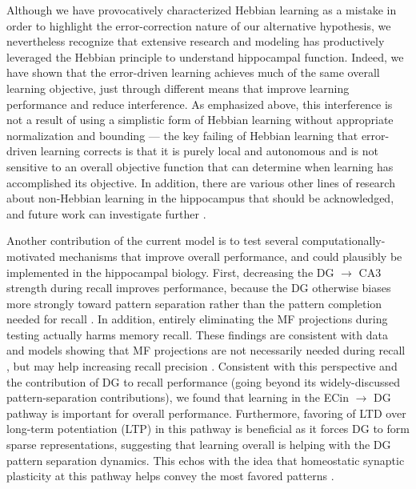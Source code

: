 \documentclass[11pt,twoside]{article}
\newif\myifpdf
\begin{document}
Although we have provocatively characterized Hebbian learning as a mistake in order to highlight the error-correction nature of our alternative hypothesis, we nevertheless recognize that extensive research and modeling has productively leveraged the Hebbian principle to understand hippocampal function.  Indeed, we have shown that the error-driven learning achieves much of the same overall learning objective, just through different means that improve learning performance and reduce interference.  As emphasized above, this interference is not a result of using a simplistic form of Hebbian learning without appropriate normalization and bounding --- the key failing of Hebbian learning that error-driven learning corrects is that it is purely local and autonomous and is not sensitive to an overall objective function that can determine when learning has accomplished its objective.  In addition, there are various other lines of research about non-Hebbian learning in the hippocampus that should be acknowledged, and future work can investigate further \citep{RebolaCartaMulle17,Jackson20,PandaRoy17,ChistiakovaBannonBazhenovEtAl14,TsukamotoYasuiYamadaEtAl03}.

Another contribution of the current model is to test several computationally-motivated mechanisms that improve overall performance, and could plausibly be implemented in the hippocampal biology. First, decreasing the DG $\rightarrow$ CA3 strength during recall improves performance, because the DG otherwise biases more strongly toward pattern separation rather than the pattern completion needed for recall \citep{OReillyMcClelland94,KunecHasselmoKopell05}. In addition, entirely eliminating the MF projections during testing actually harms memory recall.  These findings are consistent with data and models showing that MF projections are not necessarily needed during recall \citep{NakashibaCushmanPelkeyEtAl12,BernierLacagninaAyoubEtAl17,Rolls13}, but may help increasing recall precision \citep{RuedigerVittoriBednarekEtAl11,NakashibaCushmanPelkeyEtAl12,BernierLacagninaAyoubEtAl17,PignatelliRyanRoyEtAl19}.  Consistent with this perspective and the contribution of DG to recall performance (going beyond its widely-discussed pattern-separation contributions), we found that learning in the ECin $\rightarrow$ DG pathway is important for overall performance.  Furthermore, favoring of LTD over long-term potentiation (LTP) in this pathway is beneficial as it forces DG to form sparse representations, suggesting that learning overall is helping with the DG pattern separation dynamics.  This echos with the idea that homeostatic synaptic plasticity at this pathway helps convey the most favored patterns \citep{Hsu07}.
\end{document}
